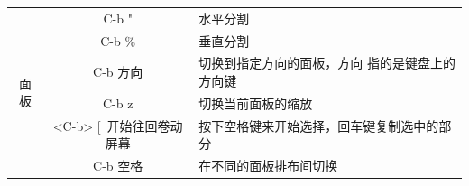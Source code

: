 \documentclass{ctexart}
\begin{document}
\begin{longtable}{c|cl}
    \hline
    \multirow{6}{*}{面板} & C-b "                                     & 水平分割                              \\*
                        & C-b \%                                    & 垂直分割                              \\*
                        & C-b 方向                                    & 切换到指定方向的面板，方向 指的是键盘上的方向键          \\*
                        & C-b z                                     & 切换当前面板的缩放                         \\*
                        & \textless{}C-b\textgreater{} {[}~开始往回卷动屏幕 & 按下空格键来开始选择，回车键复制选中的部分             \\*
                        & C-b 空格                                    & 在不同的面板排布间切换                       \\
    \hline
    \end{longtable}
\end{document}
